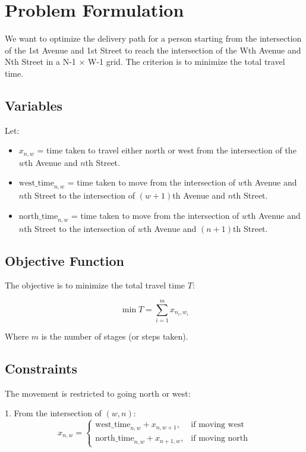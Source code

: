 \documentclass{article}
\begin{document}
\section*{Problem Formulation}

We want to optimize the delivery path for a person starting from the intersection of the 1st Avenue and 1st Street to reach the intersection of the Wth Avenue and Nth Street in a N-1 × W-1 grid. The criterion is to minimize the total travel time.

\subsection*{Variables}

Let:
\begin{itemize}
    \item \( x_{n,w} \) = time taken to travel either north or west from the intersection of the \( w \)th Avenue and \( n \)th Street.
    \item \( \text{west\_time}_{n,w} \) = time taken to move from the intersection of \( w \)th Avenue and \( n \)th Street to the intersection of \( (w+1) \)th Avenue and \( n \)th Street.
    \item \( \text{north\_time}_{n,w} \) = time taken to move from the intersection of \( w \)th Avenue and \( n \)th Street to the intersection of \( w \)th Avenue and \( (n+1) \)th Street.
\end{itemize}

\subsection*{Objective Function}

The objective is to minimize the total travel time \( T \):

\[
\min T = \sum_{i=1}^{m} x_{n_i, w_i}
\]

Where \( m \) is the number of stages (or steps taken).

\subsection*{Constraints}

The movement is restricted to going north or west:

1. From the intersection of \( (w, n) \):
   \[
   x_{n,w} = \begin{cases}
   \text{west\_time}_{n,w} + x_{n,w+1}, & \text{if moving west} \\
   \text{north\_time}_{n,w} + x_{n+1,w}, & \text{if moving north}
   \end{cases}
   \]
\end{document}

